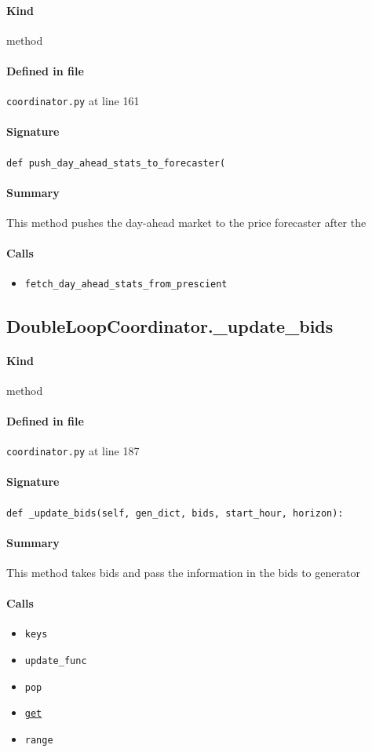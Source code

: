 \documentclass[11pt]{report}
\begin{document}
\paragraph{Kind} method
\paragraph{Defined in file} \texttt{coordinator.py} at line 161
\paragraph{Signature} \texttt{def push\_day\_ahead\_stats\_to\_forecaster(}
\paragraph{Summary} This method pushes the day-ahead market to the price forecaster after the
\paragraph{Calls}
\begin{itemize}[leftmargin=*]
  \item \texttt{fetch\_day\_ahead\_stats\_from\_prescient}
\end{itemize}
\subsection{DoubleLoopCoordinator.\_update\_bids}
\label{def:coordinator.py:DoubleLoopCoordinator._update_bids:L187}
\paragraph{Kind} method
\paragraph{Defined in file} \texttt{coordinator.py} at line 187
\paragraph{Signature} \texttt{def \_update\_bids(self, gen\_dict, bids, start\_hour, horizon):}
\paragraph{Summary} This method takes bids and pass the information in the bids to generator
\paragraph{Calls}
\begin{itemize}[leftmargin=*]
  \item \texttt{keys}
  \item \texttt{update\_func}
  \item \texttt{pop}
  \item \hyperref[def:tests-test_backcaster.py:DAPrices.get:L294]{\texttt{get}}
  \item \texttt{range}
\end{itemize}
\end{document}
